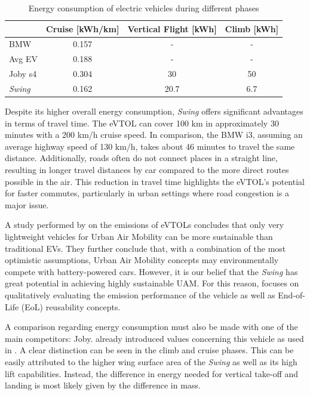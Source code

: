 \begin{table}[H]
    \caption{Energy consumption of electric vehicles during different phases}
    \centering
    \begin{tabular}{l|S[table-format=1.3]S[table-format=2.1]S[table-format=2.1]}
        \toprule
        \textbf{} & \textbf{Cruise [\unit{kWh/km}]} & \textbf{Vertical Flight [\unit{kWh}]} & \textbf{Climb [\unit{kWh}]} \\ \midrule
        BMW & 0.157 & {-} & {-} \\
        Avg EV & 0.188 & {-} & {-} \\
        Joby s4 & 0.304 & 30 & 50 \\
        \textit{Swing} & 0.162 & 20.7 & 6.7 \\ \bottomrule
    \end{tabular}
    \label{tab:energyconsumption}
\end{table}


Despite its higher overall energy consumption, \textit{Swing} offers significant advantages in terms of travel time.
The eVTOL can cover 100 km in approximately 30 minutes with a 200 km/h cruise speed.
In comparison, the BMW i3, assuming an average highway speed of 130 km/h, takes about 46 minutes to travel the same distance.
Additionally, roads often do not connect places in a straight line, resulting in longer travel distances by car compared to the more direct routes possible in the air.
This reduction in travel time highlights the eVTOL’s potential for faster commutes, particularly in urban settings where road congestion is a major issue.

A study performed by \textcite{andre2019robust} on the emissions of eVTOLs concludes that only very lightweight vehicles for Urban Air Mobility can be more sustainable than traditional EVs.
They further conclude that, with a combination of the most optimistic assumptions, Urban Air Mobility concepts may environmentally compete with battery-powered cars.
However, it is our belief that the \textit{Swing} has great potential in achieving highly sustainable UAM.
For this reason, 
focuses on qualitatively evaluating the emission performance of the vehicle as well as End-of-Life
(EoL) reusability concepts.

A comparison regarding energy consumption must also be made with one of the main competitors: Joby.  already introduced values concerning this vehicle as used in \cite{ha2022urban}. A clear distinction can be seen in the climb and cruise phases. This can be easily attributed to the higher wing surface area of the \textit{Swing} as well as its high lift capabilities. Instead, the difference in energy needed for vertical take-off and landing is most likely given by the difference in mass.


